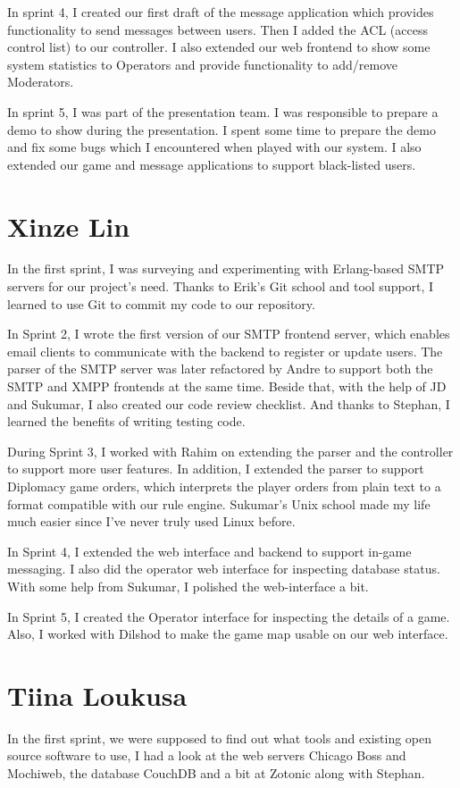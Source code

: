 \documentclass[11pt,a4paper]{report}
\begin{document}
In sprint 4, I created our first draft of the message application which provides
functionality to send messages between users. Then I added the ACL (access
control list) to our controller. I also extended our web frontend to show some
system statistics to Operators and provide functionality to add/remove
Moderators.

In sprint 5, I was part of the presentation team. I was responsible to prepare a
demo to show during the presentation. I spent some time to prepare the demo and
fix some bugs which I encountered when played with our system. I also extended
our game and message applications to support black-listed users.

\section{Xinze Lin}
In the first sprint, I was surveying and experimenting with Erlang-based SMTP
servers for our project's need. Thanks to Erik's Git school and tool support, I
learned to use Git to commit my code to our repository.

In Sprint 2, I wrote the first version of our SMTP frontend server, which
enables email clients to communicate with the backend to register or update
users. The parser of the SMTP server was later refactored by Andre to support
both the SMTP and XMPP frontends at the same time. Beside that, with the help of
JD and Sukumar, I also created our code review checklist. And thanks to Stephan,
I learned the benefits of writing testing code.

During Sprint 3, I worked with Rahim on extending the parser and the controller
to support more user features. In addition, I extended the parser to support
Diplomacy game orders, which interprets the player orders from plain text to a
format compatible with our rule engine. Sukumar's Unix school made my life much
easier since I've never truly used Linux before.

In Sprint 4, I extended the web interface and backend to support in-game
messaging. I also did the operator web interface for inspecting database
status. With some help from Sukumar, I polished the web-interface a bit.

In Sprint 5, I created the Operator interface for inspecting the details of a
game. Also, I worked with Dilshod to make the game map usable on our web
interface.
\section{Tiina Loukusa}
In the first sprint, we were supposed to find out what tools and existing
open source software to use, I had a look at the web servers Chicago Boss and
Mochiweb, the database CouchDB and a bit at Zotonic along with Stephan.
\end{document}
